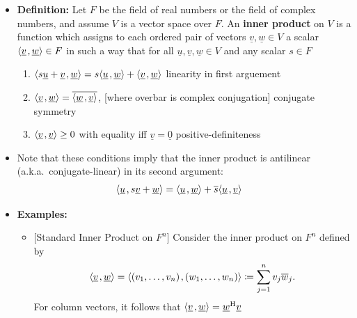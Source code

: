 \documentclass[11pt,twoside]{report}
\newcommand{\vecnot}{\underline}
\newcommand{\Herm}{{\mathrm{H}}}
\newcommand{\inner}[2]{{\left\langle #1 \mskip2mu , #2 \right\rangle}}
\begin{document}
\begin{itemize}
\item \textbf{Definition:} Let $F$ be the field of real numbers or the field of complex numbers, and assume $V$ is a vector space over $F$.
An \textbf{inner product} on $V$ is a function which assigns to each ordered pair of vectors $\vecnot{v}, \vecnot{w} \in V$ a scalar $\inner{ \vecnot{v} }{ \vecnot{w} } \in F$ in such a way that for all $\vecnot{u}, \vecnot{v}, \vecnot{w} \in V$ and any scalar $s \in F$
\begin{enumerate}
\item $\inner{ s \vecnot{u} + \vecnot{v} }{ \vecnot{w} } = s \inner{ \vecnot{u} }{ \vecnot{w} } + \inner{ \vecnot{v} }{ \vecnot{w} }$
 \hfill linearity in first arguement 
\item $\inner{ \vecnot{v} }{ \vecnot{w} }= \overline{ \inner{ \vecnot{w} }{ \vecnot{v} } }$, [where overbar is complex conjugation] \hfill conjugate symmetry\item $\inner{ \vecnot{v} }{ \vecnot{v} } \geq 0$ with equality iff $\vecnot{v} = \vecnot{0}$ \hfill positive-definiteness
\end{enumerate}


\item Note that these conditions imply that the inner product is antilinear (a.k.a.\ conjugate-linear)  in its second argument: 
\begin{align*}
\inner{ \vecnot{u} }{ s \vecnot{v} + \vecnot{w} }
&= \inner{ \vecnot{u} }{ \vecnot{w} } + \overline{s} \inner{ \vecnot{u} }{ \vecnot{v} }
\end{align*}


\item \textbf{Examples:}
\begin{itemize}
\item {} [Standard Inner Product on $F^n$]
Consider the inner product on $F^n$ defined by 
\begin{equation*}
\inner{ \vecnot{v} }{ \vecnot{w} } = \inner{ (v_1, \ldots, v_n) }{ (w_1, \ldots, w_n) }
\coloneqq\sum_{j=1}^n v_j \overline{w}_j.
\end{equation*}
For column vectors, it follows that $ \inner{ \vecnot{v} }{ \vecnot{w} } = \vecnot{w}^\Herm \vecnot{v} $



\end{itemize}
\end{itemize}
\end{document}
